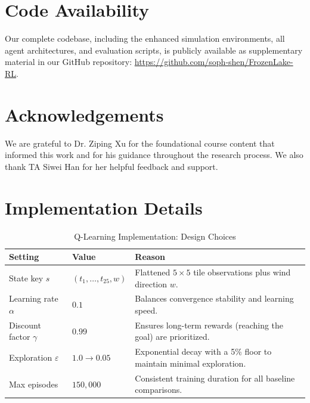 \documentclass{article}
\begin{document}
\section*{Code Availability}
Our complete codebase, including the enhanced simulation environments, all agent architectures, and evaluation scripts, is publicly available as supplementary material in our GitHub repository: \url{https://github.com/soph-shen/FrozenLake-RL}.

\section*{Acknowledgements}
We are grateful to Dr. Ziping Xu for the foundational course content that informed this work and for his guidance throughout the research process. We also thank TA Siwei Han for her helpful feedback and support.

\newpage



\newpage
\appendix
\section{Implementation Details}
\label{sec:appendix}

\begin{table}[H]
\centering
\small
\caption{Q-Learning Implementation: Design Choices}
\label{tab:q_params}
    \begin{tabularx}{\textwidth}{l l X}
    \toprule
    \textbf{Setting} & \textbf{Value} & \textbf{Reason} \\
    \midrule
        State key $s$ & $(t_1, \ldots, t_{25}, w)$
            & Flattened $5 \times 5$ tile observations plus wind direction $w$. \\[4pt]
        Learning rate $\alpha$ & $0.1$
            & Balances convergence stability and learning speed. \\[4pt]
        Discount factor $\gamma$ & $0.99$
            & Ensures long-term rewards (reaching the goal) are prioritized. \\[4pt]
        Exploration $\varepsilon$ & $1.0 \to 0.05$
            & Exponential decay with a 5\% floor to maintain minimal exploration. \\[4pt]
        Max episodes & $150{,}000$
            & Consistent training duration for all baseline comparisons. \\
    \bottomrule
    \end{tabularx}
\end{table}
\end{document}
